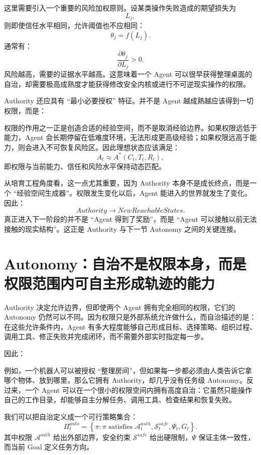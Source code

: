 这里需要引入一个重要的风险加权原则。设某类操作失败造成的期望损失为
\[
L_j,
\]
则即使信任水平相同，允许阈值也不应相同：
\[
\theta_j
=
f(L_j).
\]
通常有：
\[
\frac{\partial\theta_j}{\partial L_j}>0.
\]
风险越高，需要的证据水平越高。这意味着一个 Agent 可以很早获得整理桌面的自治，却需要极高成熟度才能获得修改安全内核或进行不可逆现实操作的权限。

Authority 还应具有 ``最小必要授权'' 特征。并不是 Agent 越成熟越应该得到一切权限，而是：
\begin{statementbox}
\centering
{}
\end{statementbox}
权限的作用之一正是创造合适的经验空间，而不是取消经验边界。如果权限远低于能力，Agent 会长期停留在低难度环境，无法形成更高级经验；如果权限远高于能力，则会进入不可恢复风险区。因此理想状态应该满足：
\[
A_t
\approx
A^*(C_t,T_t,R_t),
\]
即权限与当前能力、信任和风险水平保持动态匹配。

从培育工程角度看，这一点尤其重要，因为 Authority 本身不是成长终点，而是一个 ``经验空间生成器''。权限发生变化以后，Agent 能进入的世界就发生了变化。因此：
\[
Authority
\rightarrow
NewReachableStates.
\]
真正进入下一阶段的并不是 ``Agent 得到了奖励''，而是 ``Agent 可以接触以前无法接触的现实结构''。这正是 Authority 与下一节 Autonomy 之间的关键连接。

\section{Autonomy：自治不是权限本身，而是权限范围内可自主形成轨迹的能力}

Authority 决定允许边界，但即使两个 Agent 拥有完全相同的权限，它们的 Autonomy 仍然可以不同。因为权限只是外部系统允许做什么，而自治描述的是：在这些允许条件内，Agent 有多大程度能够自己形成目标、选择策略、组织过程、调用工具、修正失败并完成闭环，而不需要外部实时指定每一步。

因此：
\begin{statementbox}
\centering
{}
\end{statementbox}

例如，一个机器人可以被授权 ``整理房间''，但如果每一步都必须由人类告诉它拿哪个物体、放到哪里，那么它拥有 Authority，却几乎没有任务级 Autonomy。反过来，一个 Agent 可以在一个很小的权限空间内拥有高度自治：它虽然只能操作自己的工作目录，却能够自主分解任务、调用工具、检查结果和恢复失败。

我们可以把自治定义成一个可行策略集合：
\[
\Pi_t^{auto}
=
\left\{
\pi:
\pi
\text{ satisfies }
\mathcal A_t^{auth},
\mathcal S_t^{safe},
\Psi_t,
G_t
\right\}.
\]
其中权限 $\mathcal A^{auth}$ 给出外部边界，安全约束 $\mathcal S^{safe}$ 给出硬限制，$\Psi$ 保证主体一致性，而当前 Goal 定义任务方向。

